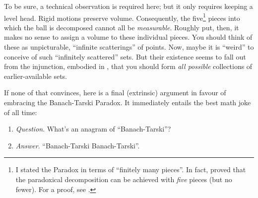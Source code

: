\documentclass[../../../include/open-logic-section]{subfiles}
\begin{document}
To be sure, a technical observation is required here; but it only
requires keeping a level head. Rigid motions preserve volume.
Consequently, the five\footnote{I stated the Paradox in terms of
``finitely many pieces''. In fact, \citet{Robinson1947} proved that
the paradoxical decomposition can be achieved with \emph{five} pieces
(but no fewer). For a proof, see \citet[pp.~66--7]{Wagon2016}.} pieces
into which the ball is decomposed cannot all be \emph{measurable}.
Roughly put, then, it makes no sense to assign a volume to these
individual pieces. You should think of these as unpicturable,
``infinite scatterings'' of points. Now, maybe it is ``weird'' to
conceive of such ``infinitely scattered'' sets. But their existence
seems to fall out from the injunction, embodied in \stagesacc{}, that
you should form \emph{all possible} collections of earlier-available
sets. 

If none of that convinces, here is a final (extrinsic) argument in
favour of embracing the Banach-Tarski Paradox. It immediately entails
the best math joke of all time:
\begin{enumerate}
	\item[] \emph{Question}. What's an anagram of ``Banach-Tarski''? 
	\item[] \emph{Answer}. ``Banach-Tarski Banach-Tarski''.
\end{enumerate}
\end{document}
